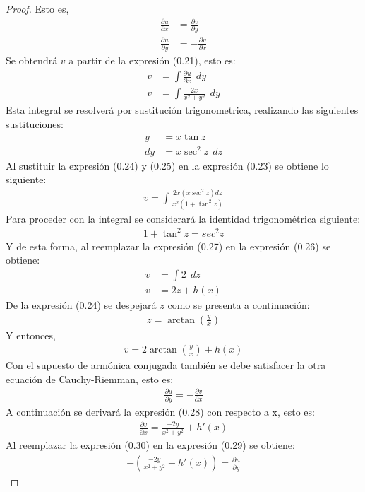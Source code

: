 \begin{enumerate}
\begin{proof}
Esto es, 
\begin{align}
\frac{\partial u}{\partial x} &= \frac{\partial v}{\partial y}\\
\frac{\partial u}{\partial y} &= -\frac{\partial v}{\partial x}
\end{align}
Se obtendrá $v$ a partir de la expresión (0.21), esto es:
\begin{align}
v&=\int \frac{\partial u}{\partial x} \ \ dy \nonumber \\
v&=\int \frac{2x}{x^2+y^2} \ \ dy
\end{align}
Esta integral se resolverá por sustitución trigonometrica, realizando las siguientes sustituciones:
\begin{align}
y&=x\tan{z} \\
dy&=x\sec^2{z} \ \ dz
\end{align}
Al sustituir la expresión (0.24) y (0.25) en la expresión (0.23) se obtiene lo siguiente: 
\begin{align}
v=\int \frac{2x(x\sec^2{z})dz}{x^2(1+\tan^2{z})}
\end{align}
Para proceder con la integral se considerará la identidad trigonométrica siguiente:
\begin{align}
1+\tan^2{z}=sec^2{z}
\end{align}
Y de esta forma, al reemplazar la expresión (0.27) en la expresión (0.26) se obtiene: 
\begin{align*}
v&=\int 2 \ \ dz\\
v&=2z+h(x)
\end{align*}
De la expresión (0.24) se despejará $z$ como se presenta a continuación: 
\begin{align*}
z=\arctan (\frac{y}{x})    
\end{align*}
Y entonces,
\begin{align}
v=2\arctan (\frac{y}{x}) +h(x)
\end{align}
Con el supuesto de armónica conjugada también se debe satisfacer la otra ecuación de Cauchy-Riemman, esto es:
\begin{align}
\frac{\partial u}{\partial y} = -\frac{\partial v}{\partial x}
\end{align}
A continuación se derivará la expresión (0.28) con respecto a x, esto es: 
\begin{align}
\frac{\partial v}{\partial x}=\frac{-2y}{x^2+y^2}+h'(x)
\end{align}
Al reemplazar la expresión (0.30) en la expresión (0.29) se obtiene:
\begin{align}
-(\frac{-2y}{x^2+y^2}+h'(x))=\frac{\partial u}{\partial y}

\end{align}
\end{proof}
\end{enumerate}
